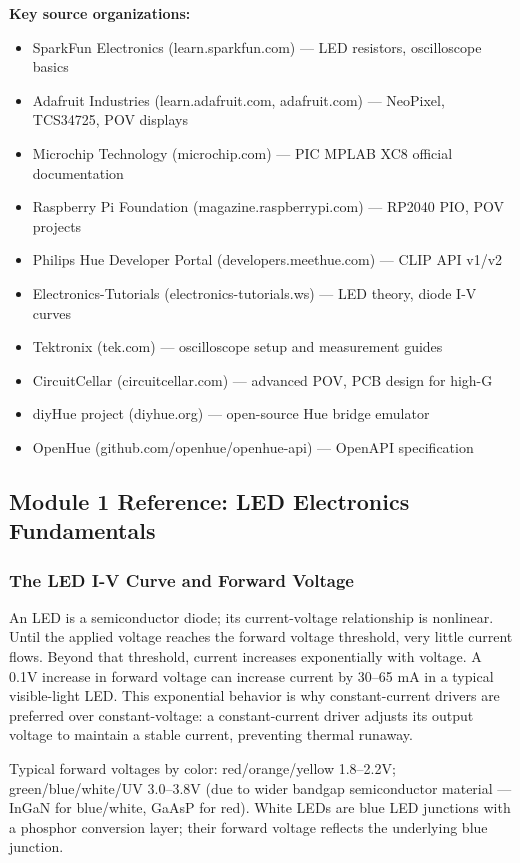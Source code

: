 \documentclass[11pt,letterpaper]{article}
\begin{document}
\textbf{Key source organizations:}
\begin{itemize}[noitemsep]
  \item SparkFun Electronics (learn.sparkfun.com) --- LED resistors, oscilloscope basics
  \item Adafruit Industries (learn.adafruit.com, adafruit.com) --- NeoPixel, TCS34725, POV displays
  \item Microchip Technology (microchip.com) --- PIC MPLAB XC8 official documentation
  \item Raspberry Pi Foundation (magazine.raspberrypi.com) --- RP2040 PIO, POV projects
  \item Philips Hue Developer Portal (developers.meethue.com) --- CLIP API v1/v2
  \item Electronics-Tutorials (electronics-tutorials.ws) --- LED theory, diode I-V curves
  \item Tektronix (tek.com) --- oscilloscope setup and measurement guides
  \item CircuitCellar (circuitcellar.com) --- advanced POV, PCB design for high-G
  \item diyHue project (diyhue.org) --- open-source Hue bridge emulator
  \item OpenHue (github.com/openhue/openhue-api) --- OpenAPI specification
\end{itemize}

\subsection{Module 1 Reference: LED Electronics Fundamentals}

\subsubsection{The LED I-V Curve and Forward Voltage}

An LED is a semiconductor diode; its current-voltage relationship is nonlinear. Until the applied voltage reaches the forward voltage threshold, very little current flows. Beyond that threshold, current increases exponentially with voltage. A 0.1V increase in forward voltage can increase current by 30--65 mA in a typical visible-light LED. This exponential behavior is why constant-current drivers are preferred over constant-voltage: a constant-current driver adjusts its output voltage to maintain a stable current, preventing thermal runaway.

Typical forward voltages by color: red/orange/yellow 1.8--2.2V; green/blue/white/UV 3.0--3.8V (due to wider bandgap semiconductor material --- InGaN for blue/white, GaAsP for red). White LEDs are blue LED junctions with a phosphor conversion layer; their forward voltage reflects the underlying blue junction.
\end{document}
